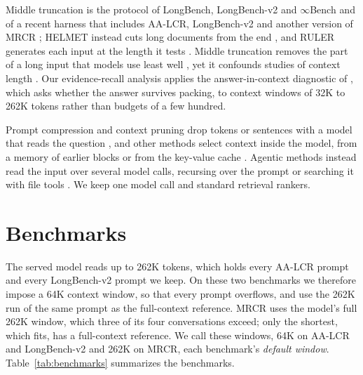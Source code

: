 \documentclass[letterpaper]{article} %
\begin{document}
Middle truncation is the protocol of LongBench, LongBench-v2 and $\infty$Bench \cite{bai2024longbench,bai2025longbenchv2,zhang2024infinitebench} and of a recent harness that includes AA-LCR, LongBench-v2 and another version of MRCR \cite{huang2026atlas}; HELMET instead cuts long documents from the end \cite{yen2025helmet}, and RULER generates each input at the length it tests \cite{hsieh2024ruler}. Middle truncation removes the part of a long input that models use least well \cite{liu2024lost}, yet it confounds studies of context length \cite{arjmandi2026distractor}. Our evidence-recall analysis applies the answer-in-context diagnostic of \citet{bala2026recall}, which asks whether the answer survives packing, to context windows of 32K to 262K tokens rather than budgets of a few hundred.

Prompt compression and context pruning drop tokens or sentences with a model that reads the question \cite{jiang2024longllmlingua,chirkova2025provence}, and other methods select context inside the model, from a memory of earlier blocks or from the key-value cache \cite{xiao2024infllm,li2024snapkv}. Agentic methods instead read the input over several model calls, recursing over the prompt \cite{zhang2025rlm} or searching it with file tools \cite{belcak2026longcontext}. We keep one model call and standard retrieval rankers.

\section{Benchmarks}
The served model reads up to 262K tokens, which holds every AA-LCR prompt and every LongBench-v2 prompt we keep. On these two benchmarks we therefore impose a 64K context window, so that every prompt overflows, and use the 262K run of the same prompt as the full-context reference. MRCR uses the model's full 262K window, which three of its four conversations exceed; only the shortest, which fits, has a full-context reference. We call these windows, 64K on AA-LCR and LongBench-v2 and 262K on MRCR, each benchmark's \emph{default window}. Table~\ref{tab:benchmarks} summarizes the benchmarks.
\end{document}
